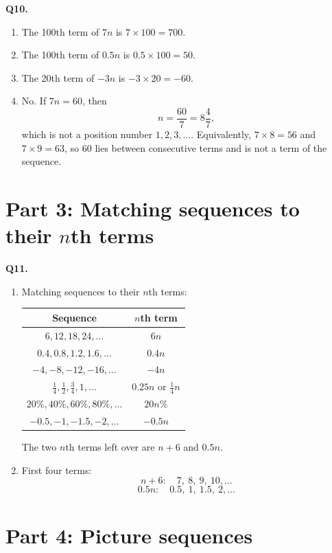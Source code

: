 \documentclass[11pt,a4paper]{article}
\begin{document}
\textbf{Q10.}
\begin{enumerate}[label=(\alph*)]
\item The 100th term of \(7n\) is \(7\times100=700\).
\item The 100th term of \(0.5n\) is \(0.5\times100=50\).
\item The 20th term of \(-3n\) is \(-3\times20=-60\).
\item No. If \(7n=60\), then
\[
n=\frac{60}{7}=8\frac47,
\]
which is not a position number \(1,2,3,\ldots\). Equivalently, \(7\times8=56\) and \(7\times9=63\), so 60 lies between consecutive terms and is not a term of the sequence.
\end{enumerate}

\section*{Part 3: Matching sequences to their \(n\)th terms}

\textbf{Q11.}
\begin{enumerate}[label=(\alph*)]
\item Matching sequences to their \(n\)th terms:
\begin{center}\small
\begin{tabular}{|c|c|}\hline
Sequence & \(n\)th term\\\hline
\(6,12,18,24,\ldots\) & \(6n\)\\
\(0.4,0.8,1.2,1.6,\ldots\) & \(0.4n\)\\
\(-4,-8,-12,-16,\ldots\) & \(-4n\)\\
\(\frac14,\frac12,\frac34,1,\ldots\) & \(0.25n\) or \(\frac14n\)\\
\(20\%,40\%,60\%,80\%,\ldots\) & \(20n\%\)\\
\(-0.5,-1,-1.5,-2,\ldots\) & \(-0.5n\)\\\hline
\end{tabular}
\end{center}
The two \(n\)th terms left over are \(n+6\) and \(0.5n\).

\item First four terms:
\[
n+6:\quad 7,\ 8,\ 9,\ 10,\ldots
\]
\[
0.5n:\quad 0.5,\ 1,\ 1.5,\ 2,\ldots
\]
\end{enumerate}

\section*{Part 4: Picture sequences}
\end{document}
